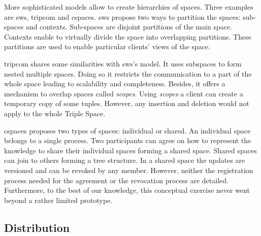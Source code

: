 More sophisticated models allow to create hierarchies of spaces.
Three examples are \ac{sws}, \ac{tripcom} and \ac{cspaces}.
\ac{sws} \citep{tolksdorf_coordination_2006} propose two ways to partition the spaces: sub-spaces and contexts.
Sub-spaces are disjoint partitions of the main space.
Contexts enable to virtually divide the space into overlapping partitions.
These partitions are used to enable particular clients' views of the space.

\ac{tripcom} shares some similarities with \ac{sws}'s model.
It uses subspaces to form nested multiple spaces.
Doing so it restricts the communication to a part of the whole space leading to scalability and completeness. %
Besides, it offers a mechanism to overlap spaces called \emph{scopes}.
Using \emph{scopes} a client can create a temporary copy of some tuples.
However, any insertion and deletion would not apply to the whole Triple Space.

\ac{cspaces} \citep{martinrecuerda_towards_2005} proposes two types of spaces: individual or shared.
An individual space belongs to a single process.
Two participants can agree on how to represent the knowledge to share their individual spaces forming a shared space.
Shared spaces can join to others forming a tree structure.
In a shared space the updates are versioned and can be revoked by any member.
However, neither the registration process needed for the agreement or the revocation process are detailed.
Furthermore, to the best of our knowledge, this conceptual exercise never went beyond a rather limited prototype.






\subsection{Distribution} %

